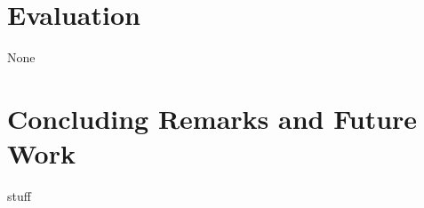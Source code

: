 \documentclass[letterpaper]{article}
\theoremstyle{definition}
\begin{document}
\section{Evaluation}
None%
%
%

\section{Concluding Remarks and Future Work}
stuff



\end{document}
